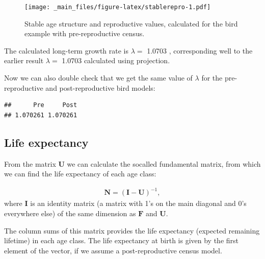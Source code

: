\documentclass[
]{book}
\newenvironment{Shaded}{\begin{snugshade}}{\end{snugshade}}
\newcommand{\FunctionTok}[1]{\textcolor[rgb]{0.00,0.00,0.00}{#1}}
\newcommand{\NormalTok}[1]{#1}
\newcommand{\OtherTok}[1]{\textcolor[rgb]{0.56,0.35,0.01}{#1}}
\newcommand{\SpecialCharTok}[1]{\textcolor[rgb]{0.00,0.00,0.00}{#1}}
\newcommand{\StringTok}[1]{\textcolor[rgb]{0.31,0.60,0.02}{#1}}
\begin{document}
\begin{figure}
\centering
\texttt{[image: \_main\_files/figure-latex/stablerepro-1.pdf]}
\caption{\label{fig:stablerepro}Stable age structure and reproductive values, calculated for the bird example with pre-reproductive census.}
\end{figure}

The calculated long-term growth rate is \(\lambda=\) 1.0703 , corresponding well to the earlier result \(\lambda=\) 1.0703 calculated using projection.

Now we can also double check that we get the same value of \(\lambda\) for the pre-reproductive and post-reproductive bird models:

\begin{Shaded}
\end{Shaded}

\begin{verbatim}
##      Pre     Post 
## 1.070261 1.070261
\end{verbatim}

\hypertarget{lifetime}{%
\subsection{Life expectancy}\label{lifetime}}

From the matrix \(\mathbf{U}\) we can calculate the socalled fundamental matrix, from which we can find the life expectancy of each age class:

\begin{align}
\mathbf{N}=(\mathbf{I}-\mathbf{U})^{-1},
\label{eq:Fundamental}
\end{align}
where \(\mathbf{I}\) is an identity matrix (a matrix with 1's on the main diagonal and 0's everywhere else) of the same dimension as \(\mathbf{F}\) and \(\mathbf{U}\).

The column sums of this matrix provides the life expectancy (expected remaining lifetime) in each age class. The life expectancy at birth is given by the first element of the vector, if we assume a post-reproductive census model.
\end{document}
